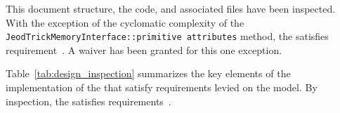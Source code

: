 %
% 

\label{inspect:TLI}
This document structure, the code, and associated files have been inspected.
With the exception of the cyclomatic complexity of the
\verb|JeodTrickMemoryInterface::primitive attributes| method,
the \ModelDesc satisfies requirement~.
A waiver has been granted for this one exception.

\label{inspect:design}
Table~\ref{tab:design_inspection} summarizes the key elements of the
implementation of the \ModelDesc that satisfy requirements levied on the model.
By inspection, the \ModelDesc satisfies
requirements~.


